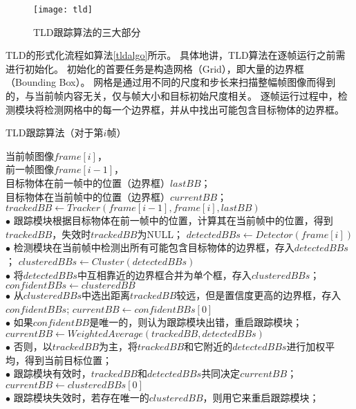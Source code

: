\begin{figure}[htb]
  \centering
  \texttt{[image: tld]}
  \caption{TLD跟踪算法的三大部分}
  \label{tld}
\end{figure}

TLD的形式化流程如算法\ref{tldalgo}所示。
具体地讲，TLD算法在逐帧运行之前需进行初始化。
初始化的首要任务是构造网格（Grid），即大量的边界框（Bounding Box）。
网格是通过用不同的尺度和步长来扫描整幅帧图像而得到的，与当前帧内容无关，仅与帧大小和目标初始尺度相关。
逐帧运行过程中，检测模块将检测网格中的每一个边界框，并从中找出可能包含目标物体的边界框。


\begin{algorithm}[htbp]
  \caption{TLD跟踪算法（对于第$i$帧）}
  \label{tldalgo}
  \footnotesize
  \begin{algorithmic}[1]
    \REQUIRE $ $ \\ 当前帧图像$frame[i]$，\\ 前一帧图像$frame[i-1]$，\\ 目标物体在前一帧中的位置（边界框）$lastBB$；
    \ENSURE $ $ \\ 目标物体在当前帧中的位置（边界框）$currentBB$；
    \STATE $trackedBB \leftarrow Tracker( frame[i-1], frame[i], lastBB )$
    \\ $\bullet$ 跟踪模块根据目标物体在前一帧中的位置，计算其在当前帧中的位置，得到$trackedBB$，失效时$trackedBB$为NULL；
    \STATE $detectedBBs \leftarrow Detector( frame[i] )$
    \\ $\bullet$ 检测模块在当前帧中检测出所有可能包含目标物体的边界框，存入$detectedBBs$；
    \STATE $clusteredBBs \leftarrow Cluster( detectedBBs )$
    \\ $\bullet$ 将$detectedBBs$中互相靠近的边界框合并为单个框，存入$clusteredBBs$；
    	\STATE $confidentBBs \leftarrow clusteredBB$ 
    	\ENDIF
    \ENDFOR
    \\ $\bullet$ 从$clusteredBBs$中选出距离$trackedBB$较远，但是置信度更高的边界框，存入$confidentBBs$;
    \STATE $currentBB \leftarrow confidentBBs[0]$ 
    \\ $\bullet$ 如果$confidentBB$是唯一的，则认为跟踪模块出错，重启跟踪模块；
	\ELSE 
	\STATE $currentBB \leftarrow WeightedAverage( trackedBB, detectedBBs )$ 
	\\ $\bullet$ 否则，以$trackedBB$为主，将$trackedBB$和它附近的$detectedBBs$进行加权平均，得到当前目标位置；
    \ENDIF
    \\ $\bullet$ 跟踪模块有效时，$trackedBB$和$detectedBBs$共同决定$currentBB$；
\ELSE
	\STATE $currentBB \leftarrow clusteredBBs[0]$
	\ENDIF
	\\ $\bullet$ 跟踪模块失效时，若存在唯一的$clusteredBB$，则用它来重启跟踪模块；
\ENDIF


\end{algorithmic}
\end{algorithm}
